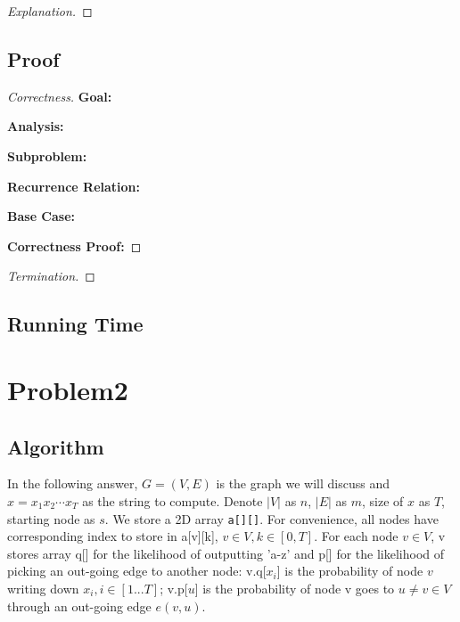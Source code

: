 \documentclass[openany]{article}
\begin{document}
\begin{proof}[Explanation]{}
		\renewcommand{\qedsymbol}{} %
       
\end{proof}

\subsection*{Proof}
\begin{proof}[Correctness]{}
    
    
\textbf{Goal:} 

\textbf{Analysis:} 
    
\textbf{Subproblem:}

    
\textbf{Recurrence Relation:}
    
    
\textbf{Base Case:}
    
    
\textbf{Correctness Proof:}

    
  

\end{proof}
\begin{proof}[Termination]{}

\end{proof}

\subsection*{Running Time}




\section*{Problem2}

\subsection*{Algorithm}
In the following answer, $G = (V,E)$ is the graph we will discuss and $x=x_1x_2\cdots x_T$ as the string to compute. Denote $|V|$ as $n$, $|E|$ as $m$, size of $x$ as $T$, starting node as $s$. We store a 2D array \texttt{a[][]}. For convenience, all nodes have corresponding index to store in a[v][k], $v\in V, k\in [0, T]$. For each node $v\in V$, v stores array q[] for the likelihood of outputting 'a-z' and p[] for the likelihood of picking an out-going edge to another node: v.q[$x_i$] is the probability of node $v$ writing down $x_i, i\in [1...T]$; v.p[$u$] is the probability of node v goes to $u \neq v \in V$ through an out-going edge $e(v,u)$. 
\end{document}
